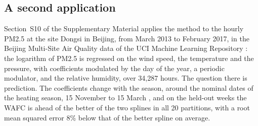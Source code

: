 

\subsection{A second application}
\label{sec:app-beijing}

Section~S10 of the Supplementary Material applies the method to the hourly
PM2.5 at the site Dongsi in Beijing, from March 2013 to February 2017, in the
Beijing Multi-Site Air Quality data of the UCI Machine Learning Repository
\citep{Chen-UCI-2017, Zhang-Guo-Dong-He-Xu-Chen-2017}:
the logarithm of PM2.5 is regressed on the wind speed, the temperature and
the pressure, with coefficients modulated by the day of the year, a periodic
modulator, and the relative humidity, over 34,287 hours. The question there
is prediction. The coefficients change with the season, around the nominal
dates of the heating season, 15 November to 15 March
\citep[Section~7]{Liang-Zou-Guo-Li-Zhang-Zhang-Huang-Chen-2015}, and on the
held-out weeks the WAFC is ahead of the better of the two splines in all 20
partitions, with a root mean squared error 8\% below that of the better
spline on average.



